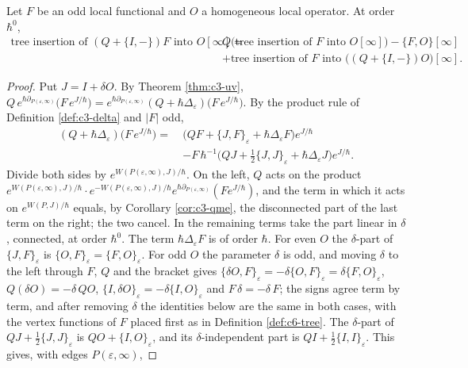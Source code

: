 \begin{lemma}
\label{lem:c6-bvexact}
Let $F$ be an odd local functional and $O$ a homogeneous local operator. At order $\hbar^0$,
\begin{equation}
\begin{aligned}
\text{tree insertion of }(Q+\{I,-\})F\text{ into }O[\infty]=\ &Q\big(\text{tree insertion of }F\text{ into }O[\infty]\big)-\{F,O\}[\infty]\\
&+\text{tree insertion of }F\text{ into }\big((Q+\{I,-\})O\big)[\infty].
\end{aligned}
\label{eq:c6-bvexact}
\end{equation}
\end{lemma}

\begin{proof}
Put $J=I+\delta O$. By Theorem \ref{thm:c3-uv}, $Q\,e^{\hbar\partial_{P(\varepsilon,\infty)}}\big(F\,e^{J/\hbar}\big)=e^{\hbar\partial_{P(\varepsilon,\infty)}}(Q+\hbar\Delta_\varepsilon)\big(F\,e^{J/\hbar}\big)$. By the product rule of Definition \ref{def:c3-delta} and $|F|$ odd,
\[
\begin{aligned}
(Q+\hbar\Delta_\varepsilon)\big(F\,e^{J/\hbar}\big)=\ &\big(QF+\{J,F\}_\varepsilon+\hbar\Delta_\varepsilon F\big)e^{J/\hbar}\\
&-F\,\hbar^{-1}\big(QJ+\tfrac12\{J,J\}_\varepsilon+\hbar\Delta_\varepsilon J\big)e^{J/\hbar}.
\end{aligned}
\]
Divide both sides by $e^{W(P(\varepsilon,\infty),J)/\hbar}$. On the left, $Q$ acts on the product $e^{W(P(\varepsilon,\infty),J)/\hbar}\cdot e^{-W(P(\varepsilon,\infty),J)/\hbar}e^{\hbar\partial_{P(\varepsilon,\infty)}}(Fe^{J/\hbar})$, and the term in which it acts on $e^{W(P,J)/\hbar}$ equals, by Corollary \ref{cor:c3-qme}, the disconnected part of the last term on the right; the two cancel. In the remaining terms take the part linear in $\delta$, connected, at order $\hbar^0$. The term $\hbar\Delta_\varepsilon F$ is of order $\hbar$. For even $O$ the $\delta$-part of $\{J,F\}_\varepsilon$ is $\{O,F\}_\varepsilon=\{F,O\}_\varepsilon$. For odd $O$ the parameter $\delta$ is odd, and moving $\delta$ to the left through $F$, $Q$ and the bracket gives $\{\delta O,F\}_\varepsilon=-\delta\{O,F\}_\varepsilon=\delta\{F,O\}_\varepsilon$, $Q(\delta O)=-\delta\,QO$, $\{I,\delta O\}_\varepsilon=-\delta\{I,O\}_\varepsilon$ and $F\,\delta=-\delta\,F$; the signs agree term by term, and after removing $\delta$ the identities below are the same in both cases, with the vertex functions of $F$ placed first as in Definition \ref{def:c6-tree}. The $\delta$-part of $QJ+\frac12\{J,J\}_\varepsilon$ is $QO+\{I,O\}_\varepsilon$, and its $\delta$-independent part is $QI+\frac12\{I,I\}_\varepsilon$. This gives, with edges $P(\varepsilon,\infty)$,

\end{proof}
